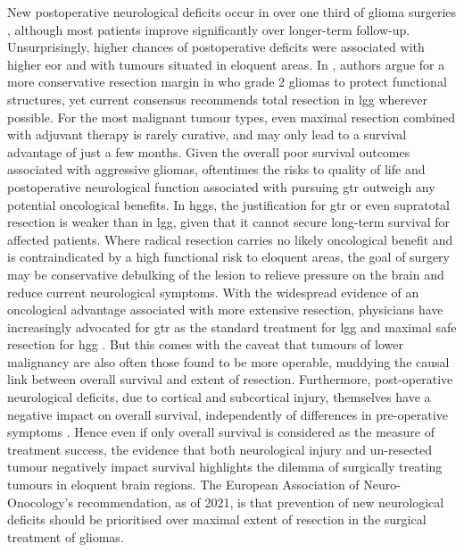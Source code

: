 \documentclass[12pt,phd,a4paper,twoside]{ucl_thesis}
\renewcommand{\textcite}[2][]{
\ifthenelse { \equal {#1} {} }  {\citeauthor{#2}\autocite{#2}}   {\citeauthor{#1}\autocite{#2}}}
\begin{document}
New postoperative neurological deficits occur in over one third of glioma surgeries \autocite{Zetterling2020a}, although most patients improve significantly over longer-term follow-up.
Unsurprisingly, higher chances of postoperative deficits were associated with higher \gls{eor} and with tumours situated in eloquent areas\autocite{Zetterling2020a}.
In \textcite{Gil-Robles2010}, authors argue for a more conservative resection margin in \gls{who} grade 2 gliomas to protect functional structures, yet current consensus recommends total resection in \gls{lgg} wherever possible\autocite{Rincon-Torroella2019,Albuquerque2021}. For the most malignant tumour types, even maximal resection combined with adjuvant therapy is rarely curative, and may only lead to a survival advantage of just a few months\autocite{Rincon-Torroella2019,Karschnia2023}.
Given the overall poor survival outcomes associated with aggressive gliomas, oftentimes the risks to quality of life and postoperative neurological function associated with pursuing \gls{gtr} outweigh any potential oncological benefits\autocite{Rahman2016,Tabor2021}.
In \glspl{hgg}, the justification for \gls{gtr} or even supratotal resection is weaker than in \gls{lgg}, given that it cannot secure long-term survival for affected patients.
Where radical resection carries no likely oncological benefit and is contraindicated by a high functional risk to eloquent areas, the goal of surgery may be conservative debulking of the lesion to relieve pressure on the brain and reduce current neurological symptoms.
With the widespread evidence of an oncological advantage associated with more extensive resection, physicians have increasingly advocated for \gls{gtr} as the standard treatment for \gls{lgg} and maximal safe resection for \gls{hgg} \autocite{Rincon-Torroella2019}.
But this comes with the caveat that tumours of lower malignancy are also often those found to be more operable, muddying the causal link between overall survival and extent of resection\autocite{Weller2021}.
Furthermore, post-operative neurological deficits, due to cortical and subcortical injury, themselves have a negative impact on overall survival, independently of differences in pre-operative symptoms \autocite{Trinh2013,Rahman2016,Rincon-Torroella2019}.
Hence even if only overall survival is considered as the measure of treatment success, the evidence that both neurological injury and un-resected tumour negatively impact survival highlights the dilemma of surgically treating tumours in eloquent brain regions\autocite{Rincon-Torroella2019,Duffau2004,Rahman2016}.
The European Association of Neuro-Onocology's recommendation, as of 2021, is that prevention of new neurological deficits should be prioritised over maximal extent of resection in the surgical treatment of gliomas\autocite{Weller2021}.
\end{document}
